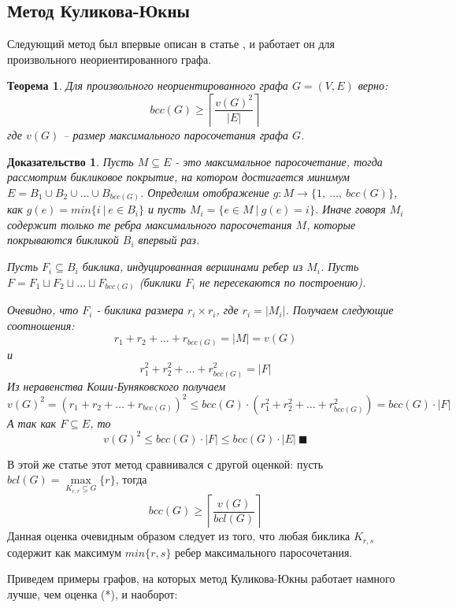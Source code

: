 \documentclass[a4paper]{article}
\newtheorem*{mtheorem}{Теорема}
\newtheorem*{msolution}{Доказательство}
\begin{document}
\subsection{Метод Куликова-Юкны}
Следующий метод был впервые описан в статье \cite{KulikovJukna}, и работает он для произвольного 
неориентированного графа.

\begin{mtheorem}
    Для произвольного неориентированного графа $G = (V, E)$ верно: $$bcc(G)\geq \left\lceil\frac{v(G)^2}{|E|}\right\rceil$$ 
    где $v(G)$ -- размер максимального паросочетания графа $G$.
\end{mtheorem}

\begin{msolution}
	Пусть $M\subseteq E$ - это максимальное паросочетание, тогда рассмотрим бикликовое покрытие, 
	на котором достигается минимум $E = B_1\cup B_2\cup \ldots \cup B_{bcc(G)}$. Определим 
	отображение $g:M\rightarrow \{1,\ \ldots,\ bcc(G)\}$, как $g(e) = min\{i\ |\ e\in B_i\}$ и пусть 
	$M_i = \{e\in M\ |\ g(e) = i\}$. Иначе говоря $M_i$ содержит только те ребра максимального 
	паросочетания $M$, которые покрываются бикликой $B_i$ впервый раз.
	
	Пусть $F_i \subseteq B_i$ биклика, индуцированная вершинами ребер из $M_i$. Пусть 
	$F = F_1\sqcup F_2\sqcup \ldots \sqcup F_{bcc(G)}$ (биклики $F_i$ не пересекаются по построению).
	
	Очевидно, что $F_i$ - биклика размера $r_i\times r_i$, где $r_i = |M_i|$. Получаем следующие 
	соотношения: $$r_1 + r_2 + \ldots + r_{bcc(G)} = |M| = v(G)$$ и 
	$$r_1^2 + r_2^2 + \ldots + r_{bcc(G)}^2 = |F|$$ Из неравенства Коши-Буняковского получаем 
	$$v(G)^2 = (r_1 + r_2 + \ldots + r_{bcc(G)})^2 \leq bcc(G)\cdot (r_1^2 + r_2^2 + \ldots + r_{bcc(G)}^2) = bcc(G)\cdot |F|$$
	А так как $F \subseteq E$, то $$v(G)^2\leq bcc(G)\cdot |F| \leq bcc(G)\cdot |E|\ \blacksquare$$

\end{msolution}

В этой же статье \cite{KulikovJukna} этот метод сравнивался с другой оценкой: пусть $bcl(G) = \max\limits_{K_{r,r}\subseteq G}\{r\}$, 
тогда
\[bcc(G) \geq \left\lceil\frac{v(G)}{bcl(G)}\right\rceil \tag{*}\]
Данная оценка очевидным образом следует из того, что любая биклика $K_{r, s}$ содержит как максимум 
$min\{r, s\}$ ребер максимального паросочетания.

Приведем примеры графов, на которых метод Куликова-Юкны работает намного лучше, чем оценка (*), и наоборот:
\end{document}
